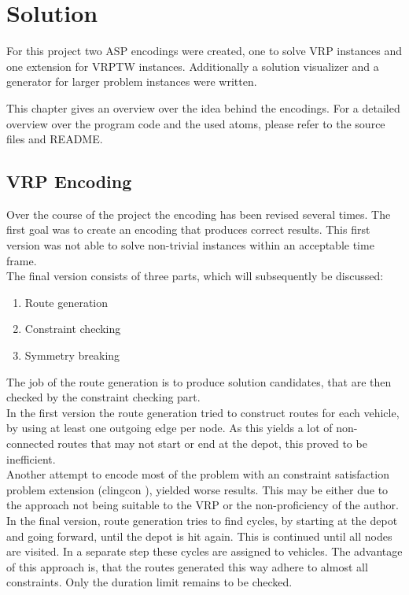 \documentclass[12pt, letterpaper]{article}
\begin{document}
\section{Solution}
For this project two ASP encodings were created, one to solve VRP instances and one extension for VRPTW instances. Additionally a solution visualizer and a generator for larger problem instances were written.

This chapter gives an overview over the idea behind the encodings. For a detailed overview over the program code and the used atoms, please refer to the source files and README.

\subsection{VRP Encoding}
Over the course of the project the encoding has been revised several times. The first goal was to create an encoding that produces correct results. This first version was not able to solve non-trivial instances within an acceptable time frame.\\
The final version consists of three parts, which will subsequently be discussed:
\begin{enumerate}
	\item Route generation
	\item Constraint checking
	\item Symmetry breaking
\end{enumerate}

The job of the route generation is to produce solution candidates, that are then checked by the constraint checking part.\\
In the first version the route generation tried to construct routes for each vehicle, by using at least one outgoing edge per node. As this yields a lot of non-connected routes that may not start or end at the depot, this proved to be inefficient.\\
Another attempt to encode most of the problem with an constraint satisfaction problem extension (clingcon \citep{potassco}), yielded worse results. This may be either due to the approach not being suitable to the VRP or the non-proficiency of the author.\\
In the final version, route generation tries to find cycles, by starting at the depot and going forward, until the depot is hit again. This is continued until all nodes are visited. In a separate step these cycles are assigned to vehicles. The advantage of this approach is, that the routes generated this way adhere to almost all constraints. Only the duration limit remains to be checked.
\end{document}
